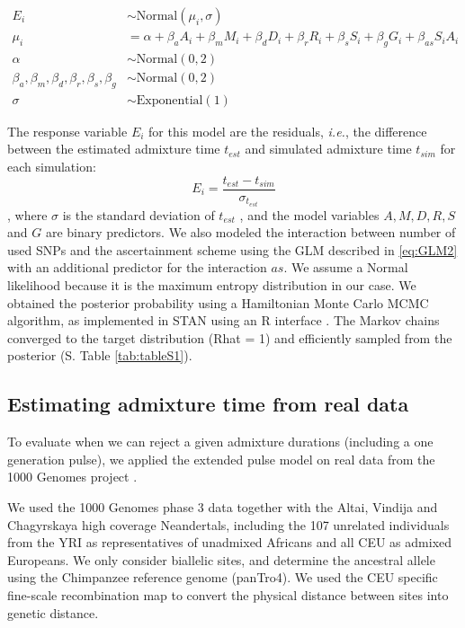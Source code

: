 \documentclass[11pt]{article}
\begin{document}
\begin{equation}\label{eq:GLM2}
\begin{split}
E_i &\sim \text{Normal}(\mu_i,\sigma) \\
\mu_i &= \alpha + \beta_aA_i + \beta_mM_i + \beta_dD_i + \beta_rR_i + \beta_{s}S_i + \beta_gG_i + \beta_{as}S_i A_i\\
\alpha &\sim \text{Normal}(0,2) \\
\beta_a,\beta_m,\beta_d,\beta_r,\beta_{s},\beta_g &\sim \text{Normal}(0,2) \\
\sigma &\sim \text{Exponential}(1)
\end{split}
\end{equation}

The response variable $E_i$ for this model are the residuals, \emph{i.e.}, the difference between the estimated admixture time $t_{est}$ and simulated admixture time $t_{sim}$ for each simulation:
$$E_i = \frac{t_{est} - t_{sim}}{\sigma_{t_{est}}}$$, where $\sigma$ is the standard deviation of $t_{est}$ , and the model variables $A, M, D, R, S$ and $G$ are binary predictors. We also modeled the interaction between number of used SNPs and the ascertainment scheme using the GLM described in \ref{eq:GLM2} with an additional predictor for the interaction $as$.
We assume a Normal likelihood because it is the maximum entropy distribution in our case. We obtained the posterior probability using a Hamiltonian Monte Carlo MCMC algorithm, as implemented in STAN \citep{carpenter_stan_2017} using an R interface \citep{stan_development_team_rstan_2018,mcelreath_statistical_2020}. The Markov chains converged to the target distribution (Rhat = 1) and efficiently sampled from the posterior (S. Table \ref{tab:tableS1}).  


\subsection{Estimating admixture time from real data}\label{Estimating admixture time from real data}
To evaluate when we can reject a given admixture durations (including a one generation pulse), we applied the extended pulse model on real data from the 1000 Genomes project \citep{the_1000_genomes_project_consortium_global_2015}.

We used the 1000 Genomes phase 3 data together with the Altai, Vindija and Chagyrskaya high coverage Neandertals, including the 107 unrelated individuals from the YRI as representatives of unadmixed Africans and all CEU as admixed Europeans. We only consider biallelic sites, and determine the ancestral allele using  the Chimpanzee reference genome (panTro4). We used the CEU specific fine-scale recombination map \citep{spence_inference_2019} to convert the physical distance between sites into genetic distance. 
\end{document}
